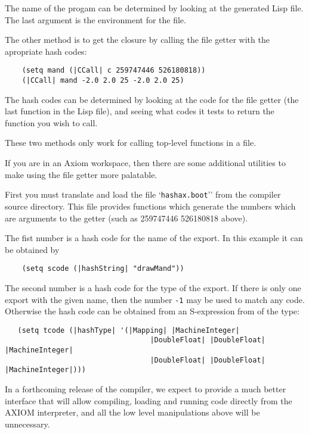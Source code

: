 The name of the progam can be determined by looking at the
generated Lisp file.
The last argument is the environment for the file.

The other method is to get the closure by calling the file getter with the
apropriate hash codes:
\begin{verbatim}
    (setq mand (|CCall| c 259747446 526180818))
    (|CCall| mand -2.0 2.0 25 -2.0 2.0 25)
\end{verbatim}

The hash codes can be determined by looking at the code for the
file getter (the last function in the Lisp file), and seeing what
codes it tests to return the function you wish to call.

These two methods only work for calling top-level functions in a file.

If you are in an {\sc Axiom} workspace, then there are some additional 
utilities to make using the file getter more palatable.

First you must translate and load the file `{\tt hashax.boot}'' from the
compiler source directory.  This file provides functions which generate the
numbers which are arguments to the getter (such as 259747446 526180818 above).

The fist number is a hash code for the name of the export. 
In this example it can be obtained by
\begin{verbatim}
    (setq scode (|hashString| "drawMand"))
\end{verbatim}

The second number is a hash code for the type of the export.
If there is only one export with the given name, then the number {\tt -1}
may be used to match any code.  Otherwise the hash code can be obtained
from an S-expression from of the type:
\begin{verbatim}
   (setq tcode (|hashType| '(|Mapping| |MachineInteger|
                                  |DoubleFloat| |DoubleFloat| |MachineInteger|
                                  |DoubleFloat| |DoubleFloat| |MachineInteger|)))
\end{verbatim}

In a forthcoming release of the \asharp{} compiler, we expect to
provide a much better interface that will allow compiling, loading
and running code directly from the AXIOM interpreter, and all the
low level manipulations above will be unnecessary.


